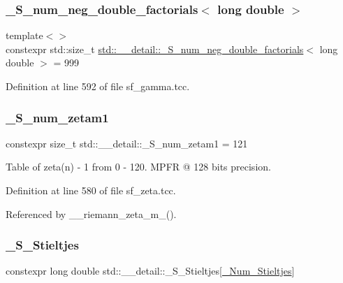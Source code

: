 \subsubsection{\texorpdfstring{\+\_\+\+S\+\_\+num\+\_\+neg\+\_\+double\+\_\+factorials$<$ long double $>$}{\_S\_num\_neg\_double\_factorials< long double >}}
{\footnotesize\ttfamily template$<$$>$ \\
constexpr std\+::size\+\_\+t \hyperlink{namespacestd_1_1____detail_ac386f200e589ce1fc895c2aac0e47f8c}{std\+::\+\_\+\+\_\+detail\+::\+\_\+\+S\+\_\+num\+\_\+neg\+\_\+double\+\_\+factorials}$<$ long double $>$ = 999}



Definition at line 592 of file sf\+\_\+gamma.\+tcc.

\mbox{\label{namespacestd_1_1____detail_a807e36c2aec3a9f27fdb21726cd464e2}} 
\subsubsection{\texorpdfstring{\+\_\+\+S\+\_\+num\+\_\+zetam1}{\_S\_num\_zetam1}}
{\footnotesize\ttfamily constexpr size\+\_\+t std\+::\+\_\+\+\_\+detail\+::\+\_\+\+S\+\_\+num\+\_\+zetam1 = 121}

Table of zeta(n) -\/ 1 from 0 -\/ 120. M\+P\+FR @ 128 bits precision. 

Definition at line 580 of file sf\+\_\+zeta.\+tcc.



Referenced by \+\_\+\+\_\+riemann\+\_\+zeta\+\_\+m\+\_().

\mbox{\label{namespacestd_1_1____detail_acc0b5ea5ffcc30a404893f434f17a865}} 
\subsubsection{\texorpdfstring{\+\_\+\+S\+\_\+\+Stieltjes}{\_S\_Stieltjes}}
{\footnotesize\ttfamily constexpr long double std\+::\+\_\+\+\_\+detail\+::\+\_\+\+S\+\_\+\+Stieltjes\mbox{[}\hyperlink{namespacestd_1_1____detail_a20c3b4334b0ffa9a5da21768d7830894}{\+\_\+\+Num\+\_\+\+Stieltjes}\mbox{]}}

